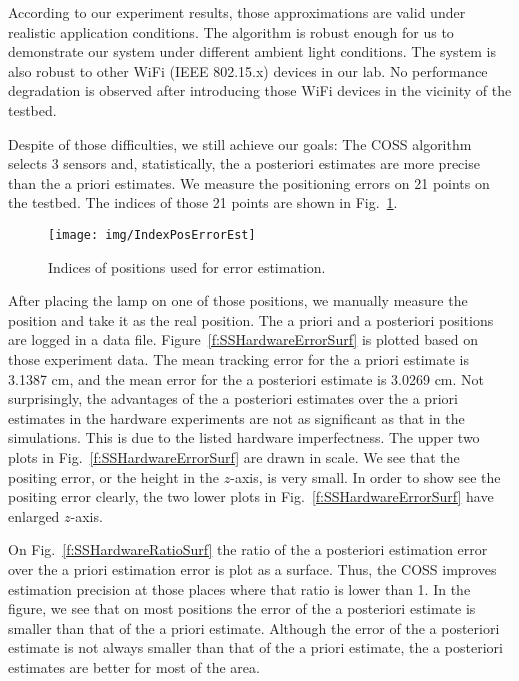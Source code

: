 According to our experiment results, those approximations are valid under realistic application conditions. The algorithm is robust enough for us to demonstrate our system under different ambient light conditions. The system is also robust to other WiFi (IEEE 802.15.x) devices in our lab. No performance degradation is observed after introducing those WiFi devices in the vicinity of the testbed.





Despite of those difficulties, we still achieve our goals: The COSS algorithm selects 3 sensors and, statistically, the a posteriori estimates are more precise than the a priori estimates. We measure the positioning errors on 21 points on the testbed.
    The indices of those 21 points are shown in Fig.~\ref{f:indices}.
\begin{figure}[!h]
  \centering
  \texttt{[image: img/IndexPosErrorEst]}\\
  \caption{Indices of positions used for error estimation.}\label{f:indices}
\end{figure}
    After placing the lamp on one of those positions, we manually measure the position and take it as the real position. The a priori and a posteriori positions are logged in a data file.
        Figure~\ref{f:SSHardwareErrorSurf} is plotted based on those experiment data. The mean tracking error for the a priori estimate is 3.1387 cm, and the mean error for the a posteriori estimate is 3.0269 cm.
 Not surprisingly, the advantages of the a posteriori estimates over the a priori estimates in the hardware experiments are not as significant as that in the simulations. This is due to the listed hardware imperfectness.
    The upper two plots in Fig.~\ref{f:SSHardwareErrorSurf} are drawn in scale. We see that the positing error, or the height in the $z$-axis, is very small. In order to show see the positing error clearly, the two lower plots in Fig.~\ref{f:SSHardwareErrorSurf} have enlarged $z$-axis.


On Fig.~\ref{f:SSHardwareRatioSurf} the ratio of the a posteriori estimation error over the a priori estimation error is plot as a surface. Thus, the COSS improves estimation precision at those places where that ratio is lower than 1. In the figure, we see that on most positions the error of the a posteriori estimate is smaller than that of the a priori estimate. Although the error of the a posteriori estimate is not always smaller than that of the a priori estimate, the a posteriori estimates are better for most of the area.


